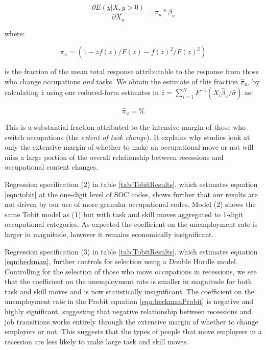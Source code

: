 \documentclass[preprint,12pt,authoryear]{elsarticle}
\begin{document}
\begin{equation}
\frac{\partial E(y|X, y>0)}{\partial X_{u}}=\pi_{u}*\beta_{u}
\end{equation}

\noindent where:

\begin{equation*}
\label{eqn:fracMeanResponse}
\pi_{u} = (1- zf( z)/F( z) - f( z)^2/F( z)^2)
\end{equation*}

\noindent  is the fraction of the mean total response attributable to the response from those who change occupations \textit{and} tasks. We obtain the estimate of this fraction $\hat{\pi}_{u}$,  by calculating $\hat{z}$ using our reduced-form estimates in $\hat{z}= \sum_{i=1}^N F^{-1}(X_i \hat{\beta}_{u}/ \hat{\sigma})$ as:

\begin{equation*}
\label{eqn:fracMeanResponseequals}
\hat{\pi}_{u} =  \%
\end{equation*}

This is a substantial fraction attributed to the intensive margin of those who switch occupations (the \textit{extent of task change}). It explains why studies look at only the extensive margin of whether to make an occupational move or not will miss a large portion of the overall relationship between recessions and occupational content changes.

\vspace{2mm}

Regression specification (2) in table \ref{tab:TobitResults}, which estimates equation \ref{eqn:tobit} at the one-digit level of SOC codes, shows further that our results are not driven by our use of more granular occupational codes. Model (2) shows the same Tobit model as (1) but with task and skill moves aggregated to 1-digit occupational categories. As expected the coefficient on the unemployment rate is larger in magnitude, however it remains economically insignificant.

\vspace{2mm}

Regression specification (3) in table \ref{tab:TobitResults}, which estimates equation \ref{eqn:heckman}, further controls for selection using a Double Hurdle model. Controlling for the selection of those who move occupations in recessions, we see that the coefficient on the unemployment rate is smaller in magnitude for both task and skill moves and is now statistically insignificant. The coefficient on the unemployment rate in the Probit equation \ref{eqn:heckmanProbit} is negative and highly significant, suggesting that negative relationship between recessions and job transitions works entirely through the extensive margin of whether to change employers or not. This suggests that the types of people that move employers in a recession are less likely to make large task and skill moves.
\end{document}
